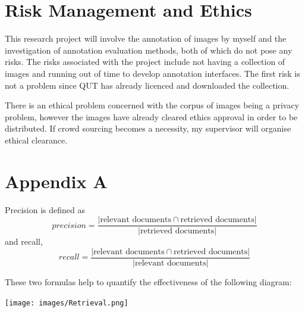 \documentclass[12pt,a4paper]{article}
\begin{document}
\section{Risk Management and Ethics}
This research project will involve the annotation of images by myself and the investigation of annotation evaluation methods, both of which do not pose any risks. The risks associated with the project include not having a collection of images and running out of time to develop annotation interfaces. The first risk is not a problem since QUT has already licenced and downloaded the collection.

There is an ethical problem concerned with the corpus of images being a privacy problem, however the images have already cleared ethics approval in order to be distributed. If crowd sourcing becomes a necessity, my supervisor will organise ethical clearance.



\newpage
\section{Appendix A}
Precision is defined as 
\begin{equation}
precision = \frac{| \text{relevant documents}\cap\text{retrieved documents}|}{|\text{retrieved documents}|}
\end{equation} and recall,
\begin{equation}
recall = \frac{| \text{relevant documents}\cap\text{retrieved documents}|}{|\text{relevant documents}|}
\end{equation}

These two formulas help to quantify the effectiveness of the following diagram:
\begin{center}
    \texttt{[image: images/Retrieval.png]}
\end{center}
\end{document}
